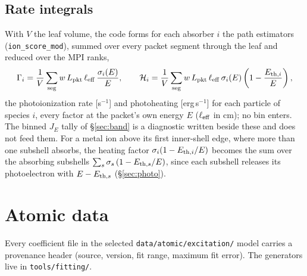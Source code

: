 \documentclass[english,a4paper]{my_memo}
\newcommand{\code}[1]{\texttt{#1}}
\begin{document}
\subsection{Rate integrals}
With $V$ the leaf volume, the code forms for each absorber $i$ the path
estimators (\code{ion\_score\_mod}), summed over every packet segment
through the leaf and reduced over the MPI ranks,
\begin{equation}
  \Gamma_i = \frac{1}{V}\sum_{\rm seg} w\,L_{\rm pkt}\,\ell_{\rm eff}\,
             \frac{\sigma_i(E)}{E},
  \qquad
  \mathcal{H}_i = \frac{1}{V}\sum_{\rm seg} w\,L_{\rm pkt}\,\ell_{\rm eff}\,
  \sigma_i(E)\left(1 - \frac{E_{{\rm th},i}}{E}\right),
  \label{eq:rates}
\end{equation}
the photoionization rate [s$^{-1}$] and photoheating [erg\,s$^{-1}$]
for each particle of species $i$, every factor at the packet's own energy
$E$ ($\ell_{\rm eff}$ in cm); no bin enters.  The binned $J_E$ tally of
\S\ref{sec:band} is a diagnostic written beside these and does not feed
them.  For a metal ion above its first inner-shell edge, where more than
one subshell absorbs, the heating factor
$\sigma_i(1 - E_{{\rm th},i}/E)$ becomes the sum over the absorbing
subshells $\sum_s \sigma_s\,(1 - E_{{\rm th},s}/E)$, since each subshell
releases its photoelectron with $E - E_{{\rm th},s}$ (\S\ref{sec:photo}).

\section{Atomic data}
\label{sec:atomic}
Every coefficient file in the selected \code{data/atomic/excitation/} model carries a provenance
header (source, version, fit range, maximum fit error).  The generators
live in \code{tools/fitting/}.
\end{document}
